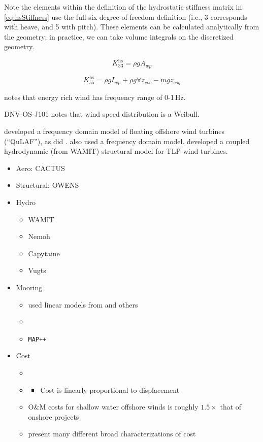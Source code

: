\documentclass[12pt]{article}
\begin{document}
\noindent{}Note the elements within the definition of the hydrostatic stiffness matrix in \eqref{eq:hsStiffness} use the full six degree-of-freedom definition (i.e., 3 corresponds with heave, and 5 with pitch).
These elements can be calculated analytically from the geometry; in practice, we can take volume integrals on the discretized geometry.

\begin{equation}
	K^{\textrm{hs}}_{33} = \rho g A_{wp}
\end{equation}

\begin{equation}
	K^{\textrm{hs}}_{55} = \rho g I_{wp} + \rho g \forall z_{cob} - m g z_{cog}
\end{equation}



\citet{Bakmar2009} notes that energy rich wind has frequency range of 0-1\,Hz.

DNV-OS-J101 \cite{DNV-OS-J101} notes that wind speed distribution is a Weibull.

\citet{Jurado2018} developed a frequency domain model of floating offshore wind turbines (``QuLAF''), as did \citet{Lupton2015}.
\citet{Tracy2007} also used a frequency domain model.
\citet{Svendsen2016} developed a coupled hydrodynamic (from WAMIT) structural model for TLP wind turbines.


\begin{itemize}
	\item Aero: CACTUS
	\item Structural: OWENS
	\item Hydro
	\begin{itemize}
		\item WAMIT
		\item Nemoh
		\item Capytaine
		\item Vugts
	\end{itemize}
	\item Mooring
	\begin{itemize}
		\item \citet{Bachynski2012} used linear models from \citet{Faltinsen1998} and others
		\item \citet{AlSolihat2014}
		\item \texttt{MAP++} \cite{Masciola2014}
	\end{itemize}
	\item Cost
	\begin{itemize}
		\item \citet{Kausche2018}
		\item \citet{Bachynski2012}
		\begin{itemize}
			\item Cost is linearly proportional to displacement
		\end{itemize}
		\item \citet{Feng2010} O\&M costs for shallow water offshore winds is roughly $1.5\times{}$ that of onshore projects
		\item \citet{Arshad2013} present many different broad characterizations of cost
	\end{itemize}
\end{itemize}



\end{document}
